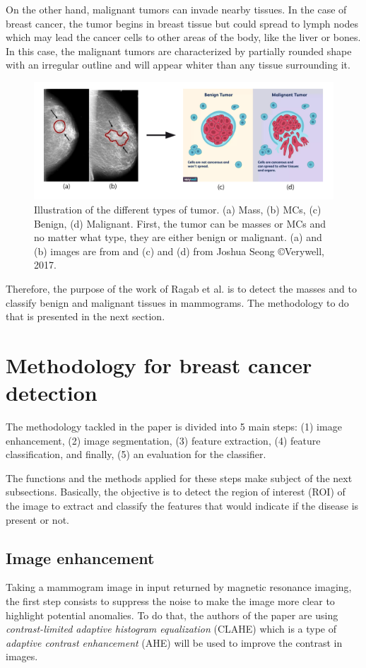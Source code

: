 \documentclass[11pt, openany]{report}
\theoremstyle{plain}
\theoremstyle{definition}
\theoremstyle{remark}
\begin{document}
On the other hand, malignant tumors can invade nearby tissues. In the case of breast cancer, the tumor begins in breast tissue but could spread to lymph nodes which may lead the cancer cells to other areas of the body, like the liver or bones. In this case, the malignant tumors are characterized by partially rounded shape with an irregular outline and will appear whiter than any tissue surrounding it.

\begin{figure}[h]
  \centering
  \includegraphics[scale=0.28]{figures/tumor-types.png}
  \caption{Illustration of the different types of tumor. (a) Mass, (b) MCs, (c) Benign, (d) Malignant. First, the tumor can be masses or MCs and no matter what type, they are either benign or malignant. (a) and (b) images are from \cite{breast-cancer} and (c) and (d) from Joshua Seong \copyright Verywell, 2017.}
  \label{fig:tumor-types}
\end{figure}

Therefore, the purpose of the work of Ragab et al. \cite{breast-cancer} is to detect the masses and to classify benign and malignant tissues in mammograms. The methodology to do that is presented in the next section.  

\section{Methodology for breast cancer detection}
The methodology tackled in the paper \cite{breast-cancer} is divided into 5 main steps: (1) image enhancement, (2) image segmentation, (3) feature extraction, (4) feature classification, and finally, (5) an evaluation for the classifier. 

The functions and the methods applied for these steps make subject of the next subsections. Basically, the objective is to detect the region of interest (ROI) of the image to extract and classify the features that would indicate if the disease is present or not. 

\subsection{Image enhancement} \label{sec:img-enhancement-breast}
Taking a mammogram image in input returned by magnetic resonance imaging, the first step consists to suppress the noise to make the image more clear to highlight potential anomalies. To do that, the authors of the paper are using \textit{contrast-limited adaptive histogram equalization} (CLAHE) which is a type of \textit{adaptive contrast enhancement} (AHE) will be used to improve the contrast in images.  
\end{document}
